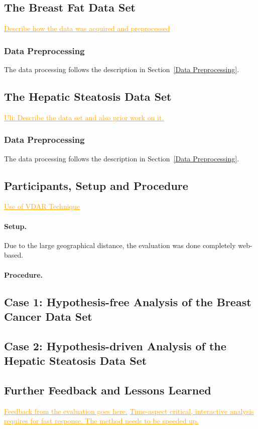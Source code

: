 \documentclass[journal]{style/vgtc} 			          %
\newcommand{\com}[1]{\textcolor{orange}{\uline{#1}}}
\begin{document}
\subsection{The Breast Fat Data Set}
\com{Describe how the data was acquired and preprocessed}

\subsubsection{Data Preprocessing} \label{application:Data Preprocessing}
The data processing follows the description in Section~\ref{Data Preprocessing}.
%

\subsection{The Hepatic Steatosis Data Set}
\com{Uli: Describe the data set and also prior work on it.}

\subsubsection{Data Preprocessing} \label{application:Data Preprocessing}
The data processing follows the description in Section~\ref{Data Preprocessing}.
%

\subsection{Participants, Setup and Procedure}
\com{Use of VDAR Technique}
%
\paragraph{Setup.} Due to the large geographical distance, the evaluation was done completely web-based.
\paragraph{Procedure.}
\subsection{Case 1: Hypothesis-free Analysis of the Breast Cancer Data Set}

\subsection{Case 2: Hypothesis-driven Analysis of the Hepatic Steatosis Data Set}
\subsection{Further Feedback and Lessons Learned} \label{Lessons Learned}
\com{Feedback from the evaluation goes here.}
\com{Time-aspect critical, interactive analysis requires for fast response. The method needs to be speeded up.}
\end{document}
